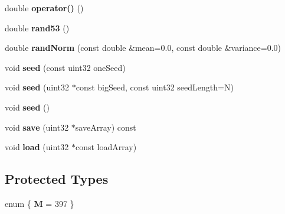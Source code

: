 \begin{DoxyCompactItemize}
\item 
\hypertarget{class_m_t_rand_abbb87a08d622d58fdee0eea4cb5471a0}{
double {\bfseries operator()} ()}
\label{class_m_t_rand_abbb87a08d622d58fdee0eea4cb5471a0}

\item 
\hypertarget{class_m_t_rand_a15f4daf79febbe4ff43c3e6ce2c4fcbe}{
double {\bfseries rand53} ()}
\label{class_m_t_rand_a15f4daf79febbe4ff43c3e6ce2c4fcbe}

\item 
\hypertarget{class_m_t_rand_af759d1f30d4f29a715e6f6e86850b5c4}{
double {\bfseries randNorm} (const double \&mean=0.0, const double \&variance=0.0)}
\label{class_m_t_rand_af759d1f30d4f29a715e6f6e86850b5c4}

\item 
\hypertarget{class_m_t_rand_a1e21a79e0a30225fffe924229e34a923}{
void {\bfseries seed} (const uint32 oneSeed)}
\label{class_m_t_rand_a1e21a79e0a30225fffe924229e34a923}

\item 
\hypertarget{class_m_t_rand_a5758103776b131e8ea46b6dc1b9fb267}{
void {\bfseries seed} (uint32 $\ast$const bigSeed, const uint32 seedLength=N)}
\label{class_m_t_rand_a5758103776b131e8ea46b6dc1b9fb267}

\item 
\hypertarget{class_m_t_rand_ad88ea3363d55bafb62826bbd130279c2}{
void {\bfseries seed} ()}
\label{class_m_t_rand_ad88ea3363d55bafb62826bbd130279c2}

\item 
\hypertarget{class_m_t_rand_ad60e0f3f5c90baab75b74f9a2ccae871}{
void {\bfseries save} (uint32 $\ast$saveArray) const }
\label{class_m_t_rand_ad60e0f3f5c90baab75b74f9a2ccae871}

\item 
\hypertarget{class_m_t_rand_a8302e9a8cd16d8dfc536a85bf2f68be0}{
void {\bfseries load} (uint32 $\ast$const loadArray)}
\label{class_m_t_rand_a8302e9a8cd16d8dfc536a85bf2f68be0}

\end{DoxyCompactItemize}
\subsection*{Protected Types}
\begin{DoxyCompactItemize}
\item 
enum \{ {\bfseries M} =  397
 \}
\end{DoxyCompactItemize}
